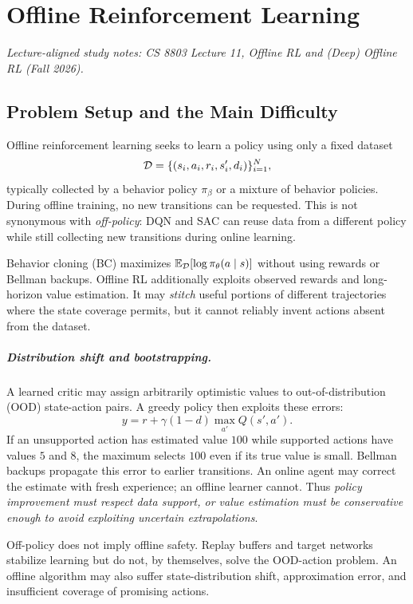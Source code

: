 \chapter{Offline Reinforcement Learning}
\label{ch:offline_rl}
\noindent\textit{Lecture-aligned study notes: CS 8803 Lecture 11, Offline RL and (Deep) Offline RL (Fall 2026).}

\section{Problem Setup and the Main Difficulty}
Offline reinforcement learning seeks to learn a policy using only a fixed dataset
\[
\mathcal{D}=\{(s_i,a_i,r_i,s'_i,d_i)\}_{i=1}^{N},
\]
typically collected by a behavior policy $\pi_\beta$ or a mixture of behavior policies. During offline training, no new transitions can be requested. This is not synonymous with \emph{off-policy}: DQN and SAC can reuse data from a different policy while still collecting new transitions during online learning.

Behavior cloning (BC) maximizes $\mathbb{E}_{\mathcal{D}}[\log\pi_\theta(a\mid s)]$ without using rewards or Bellman backups. Offline RL additionally exploits observed rewards and long-horizon value estimation. It may \emph{stitch} useful portions of different trajectories where the state coverage permits, but it cannot reliably invent actions absent from the dataset.

\paragraph{Distribution shift and bootstrapping.}
A learned critic may assign arbitrarily optimistic values to out-of-distribution (OOD) state-action pairs. A greedy policy then exploits these errors:
\[
y=r+\gamma(1-d)\max_{a'}Q(s',a').
\]
If an unsupported action has estimated value $100$ while supported actions have values $5$ and $8$, the maximum selects $100$ even if its true value is small. Bellman backups propagate this error to earlier transitions. An online agent may correct the estimate with fresh experience; an offline learner cannot. Thus \emph{policy improvement must respect data support, or value estimation must be conservative enough to avoid exploiting uncertain extrapolations}.

\begin{pitfall}
Off-policy does not imply offline safety. Replay buffers and target networks stabilize learning but do not, by themselves, solve the OOD-action problem. An offline algorithm may also suffer state-distribution shift, approximation error, and insufficient coverage of promising actions.
\end{pitfall}

